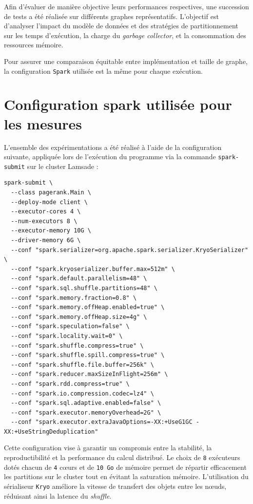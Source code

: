\documentclass[conference]{IEEEtran}
\begin{document}
Afin d'évaluer de manière objective leurs performances respectives, une succession de tests a été réalisée sur différents graphes représentatifs.
L'objectif est d'analyser l'impact du modèle de données et des stratégies de partitionnement sur les temps d'exécution, la charge du \textit{garbage collector}, et la consommation des ressources mémoire.

Pour assurer une comparaison équitable entre implémentation et taille de graphe, la configuration \texttt{Spark} utilisée est la même pour chaque exécution.

\clearpage

\section{Configuration \gls{spark} utilisée pour les mesures}

L'ensemble des expérimentations a été réalisé à l'aide de la configuration suivante, appliquée lors de l'exécution du programme via la commande \texttt{spark-submit} sur le \gls{cluster} Lamsade :

\begin{lstlisting}
spark-submit \
  --class pagerank.Main \
  --deploy-mode client \
  --executor-cores 4 \
  --num-executors 8 \
  --executor-memory 10G \
  --driver-memory 6G \
  --conf "spark.serializer=org.apache.spark.serializer.KryoSerializer" \
  --conf "spark.kryoserializer.buffer.max=512m" \
  --conf "spark.default.parallelism=48" \
  --conf "spark.sql.shuffle.partitions=48" \
  --conf "spark.memory.fraction=0.8" \
  --conf "spark.memory.offHeap.enabled=true" \
  --conf "spark.memory.offHeap.size=4g" \
  --conf "spark.speculation=false" \
  --conf "spark.locality.wait=0" \
  --conf "spark.shuffle.compress=true" \
  --conf "spark.shuffle.spill.compress=true" \
  --conf "spark.shuffle.file.buffer=256k" \
  --conf "spark.reducer.maxSizeInFlight=256m" \
  --conf "spark.rdd.compress=true" \
  --conf "spark.io.compression.codec=lz4" \
  --conf "spark.sql.adaptive.enabled=false" \
  --conf "spark.executor.memoryOverhead=2G" \
  --conf "spark.executor.extraJavaOptions=-XX:+UseG1GC -XX:+UseStringDeduplication"
\end{lstlisting}

Cette configuration vise à garantir un compromis entre la stabilité, la reproductibilité et la performance du calcul distribué.  
Le choix de \texttt{8} exécuteurs dotés chacun de \texttt{4} cœurs et de \texttt{10~Go} de mémoire permet de répartir efficacement les partitions sur le \gls{cluster} tout en évitant la saturation mémoire.  
L'utilisation du sérialiseur \texttt{Kryo} améliore la vitesse de transfert des objets entre les nœuds, réduisant ainsi la latence du \textit{shuffle}.
\end{document}
